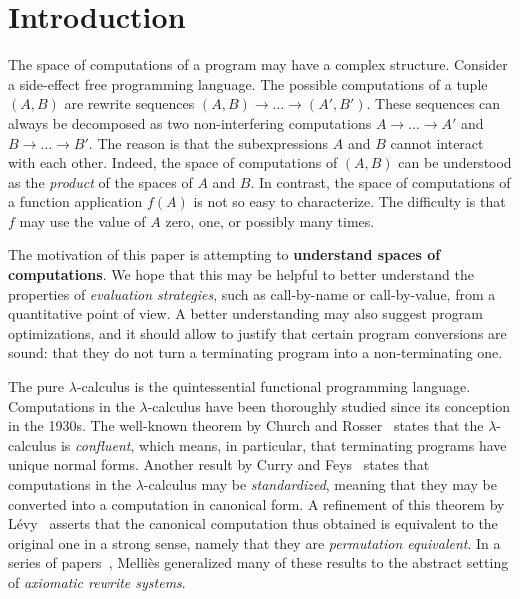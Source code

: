 \chapter{Introduction}

The space of computations of a program may have a complex structure.
Consider a side-effect free programming language.
The possible computations of a tuple $(A,B)$
are rewrite sequences $(A,B) \to \hdots \to (A',B')$.
These sequences can always be decomposed as two non-interfering computations
$A \to \hdots \to A'$ and $B \to \hdots \to B'$.
The reason is that the subexpressions $A$ and $B$ cannot interact with each other.
Indeed, the space of computations of $(A,B)$ can be understood as
the {\em product} of the spaces of $A$ and $B$.
In contrast, the space of computations of a function application $f(A)$ is not so easy
to characterize. The difficulty is that $f$ may use the value of $A$ zero, one, or
possibly many times.

The motivation of this paper is attempting to {\bf understand spaces of computations}.
We hope that this may be helpful to better understand the properties of {\em evaluation strategies},
such as call-by-name or call-by-value,
from a quantitative point of view.
A better understanding may also suggest program optimizations,
and it should allow to justify that certain program conversions are sound:
\eg that they do not turn a terminating program into a non-terminating one.

The pure $\lambda$-calculus is the quintessential functional programming language.
Computations in the $\lambda$-calculus have been thoroughly
studied since its conception in the 1930s.
The well-known theorem by Church and Rosser~\cite{church1936some}
states that the $\lambda$-calculus is \emph{confluent},
which means, in particular, that terminating programs have unique normal forms.
Another result by Curry and Feys~\cite{curry1958combinatory}
states that computations in the
$\lambda$-calculus may be \emph{standardized},
meaning that they may be converted into a computation in canonical form.
A refinement of this theorem by L\'evy~\cite{Tesis:Levy:1978}
asserts that the canonical computation thus obtained is equivalent to the
original one in a strong sense, namely that they are \emph{permutation equivalent}.
In a series of papers~\cite{DBLP:conf/ctcs/Mellies97,DBLP:journals/logcom/Mellies00,DBLP:conf/rta/Mellies02,mellies2002axiomatic,DBLP:conf/birthday/Mellies05},
Melli\`es generalized many of these results to the abstract setting of {\em axiomatic rewrite systems}.

